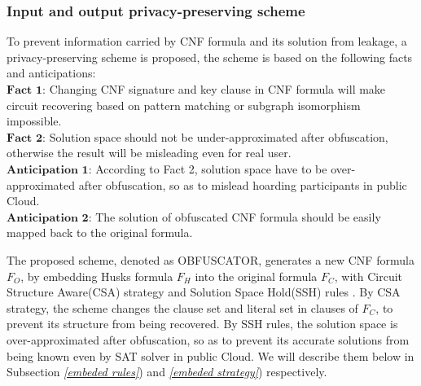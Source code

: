 \documentclass[conference,compsocconf]{IEEEtran}
\begin{document}
\subsubsection{Input and output privacy-preserving scheme}
To prevent information carried by CNF formula and its solution from leakage, a privacy-preserving scheme is proposed,
the scheme is based on the following facts and anticipations:
\\$\textbf{Fact 1:}$ Changing CNF signature and key clause in CNF formula will make circuit recovering
based on pattern matching or subgraph isomorphism impossible.
\\$\textbf{Fact 2:}$ Solution space should not be under-approximated after obfuscation, otherwise the result will be misleading even for real user.
\\$\textbf{Anticipation 1:}$ According to Fact 2, solution space have to be over-approximated  after obfuscation, so as to mislead hoarding participants in public Cloud.
\\$\textbf{Anticipation 2:}$ The solution of obfuscated CNF formula should be easily mapped back to the original formula.

The proposed scheme, denoted as OBFUSCATOR, generates a new CNF formula $F_O$, 
by embedding Husks formula $F_H$ into the original formula $F_C$, 
with Circuit Structure Aware(CSA) strategy and Solution Space Hold(SSH) rules .
By CSA strategy, 
the scheme changes the clause set and literal set in clauses of $F_C$, 
to prevent its structure from being recovered.
By SSH rules, 
the solution space is over-approximated after obfuscation, 
so as to prevent its accurate solutions from being known even by SAT solver in public Cloud.
We will describe them below in Subsection \textit{\ref{embeded rules}}) and \textit{\ref{embeded strategy}}) respectively. 
\end{document}
